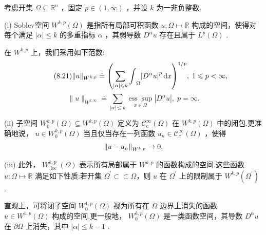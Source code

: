 考虑开集 $\Omega  \subseteq  {\mathbb{R}}^{n}$ ，固定 $p \in  \left(  {1,\infty }\right)$ ，并设 $k$ 为一非负整数.

\begin{definition}[Soblev空间]\label{def:sobolev-space}
(i) Soblev空间 ${W}^{k,p}\left( \Omega \right)$ 是指所有局部可积函数 $u : \Omega  \mapsto  \mathbb{R}$ 构成的空间，使得对每个满足 $\left| \alpha \right|  \leq  k$ 的多重指标 $\alpha$ ，其弱导数 ${D}^{\alpha }u$ 存在且属于 ${L}^{p}\left( \Omega \right)$ .

在 ${W}^{k,p}$ 上，我们采用如下范数:
\begin{equation}\tag{8.21}\label{eq:sobolev-norm-p}
\| u{\| }_{{W}^{k,p}} \doteq  {\left( \sum_{{\left| \alpha \right|  \leqslant k}}{\int }_{\Omega }{\left| {D}^{\alpha }u\right| }^{p}\mathop{}\!\mathrm{d}x\right) }^{1/p},\;1 \leqslant  p < \infty ,
\end{equation}
\begin{equation}\tag{8.22}\label{eq:sobolev-norm-infty}
\| u{\| }_{{W}^{k,\infty }} \doteq  \sum_{{\left| \alpha \right|  \leq  k}}\underset{x \in  \Omega }{\operatorname{ess}\sup }\left| {{D}^{\alpha }u}\right|,\;p = \infty .
\end{equation}

(ii) 子空间 ${W}_{0}^{k,p}\left( \Omega \right)  \subseteq  {W}^{k,p}\left( \Omega \right)$ 定义为 ${\mathcal{C}}_{c}^{\infty }\left( \Omega \right)$ 在 ${W}^{k,p}\left( \Omega \right)$ 中的闭包.更准确地说， $u \in  {W}_{0}^{k,p}\left( \Omega \right)$ 当且仅当存在一列函数 ${u}_{n} \in  {\mathcal{C}}_{c}^{\infty }\left( \Omega \right)$ ，使得
\[
{\norm{u - u_n}}_{{W}^{k,p}} \rightarrow  0.
\]

(iii) 此外， ${W}_{\text{ loc }}^{k,p}\left( \Omega \right)$ 表示所有局部属于 ${W}^{k,p}$ 的函数构成的空间.这些函数 $u : \Omega  \mapsto  \mathbb{R}$ 满足如下性质:若开集 ${\Omega }^{\prime } \subset  \subset  \Omega$\footnotemark，则 $u$ 在 ${\Omega }^{\prime }$ 上的限制属于 ${W}^{k,p}\left( {\Omega }^{\prime }\right)$ .
\end{definition}

直观上，可将闭子空间 ${W}_{0}^{1,p}\left( \Omega \right)$ 视为所有在 $\Omega$ 边界上消失的函数 $u \in  {W}^{1,p}\left( \Omega \right)$ 构成的空间.更一般地， ${W}_{0}^{k,p}\left( \Omega \right)$ 是一类函数空间，其导数 ${D}^{\alpha }u$ 在 $\partial \Omega$ 上消失，其中 $\left| \alpha \right|  \leq  k - 1$ .

